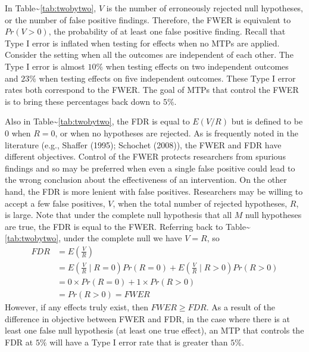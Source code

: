 \documentclass[
]{article}
\begin{document}
In Table\textasciitilde{}\ref{tab:twobytwo}, \(V\) is the number of
erroneously rejected null hypotheses, or the number of false positive
findings. Therefore, the FWER is equivalent to \(Pr(V > 0)\), the
probability of at least one false positive finding. Recall that Type I
error is inflated when testing for effects when no MTPs are applied.
Consider the setting when all the outcomes are independent of each
other. The Type I error is almost \(10\%\) when testing effects on two
independent outcomes and \(23\%\) when testing effects on five
independent outcomes. These Type I error rates both correspond to the
FWER. The goal of MTPs that control the FWER is to bring these
percentages back down to \(5\%\).

Also in Table\textasciitilde{}\ref{tab:twobytwo}, the FDR is equal to
\(E(V/R)\) but is defined to be \(0\) when \(R=0\), or when no
hypotheses are rejected. As is frequently noted in the literature (e.g.,
Shaffer (1995); Schochet (2008)), the FWER and FDR have different
objectives. Control of the FWER protects researchers from spurious
findings and so may be preferred when even a single false positive could
lead to the wrong conclusion about the effectiveness of an intervention.
On the other hand, the FDR is more lenient with false positives.
Researchers may be willing to accept a few false positives, \(V\), when
the total number of rejected hypotheses, \(R\), is large. Note that
under the complete null hypothesis that all \(M\) null hypotheses are
true, the FDR is equal to the FWER. Referring back to
Table\textasciitilde{}\ref{tab:twobytwo}, under the complete null we
have \(V = R\), so \begin{align*}
FDR &= E\left(\frac{V}{R}\right)\\
&=  E\left(\frac{V}{R}\mid R = 0\right) Pr(R = 0) + E\left(\frac{V}{R} \mid R > 0\right)Pr(R > 0) \\
&= 0 \times Pr(R = 0) + 1 \times Pr(R > 0) \\
&= Pr(R > 0) = FWER
\end{align*} However, if any effects truly exist, then
\(FWER \geq FDR\). As a result of the difference in objective between
FWER and FDR, in the case where there is at least one false null
hypothesis (at least one true effect), an MTP that controls the FDR at
\(5\%\) will have a Type I error rate that is greater than \(5\%\).
\end{document}

